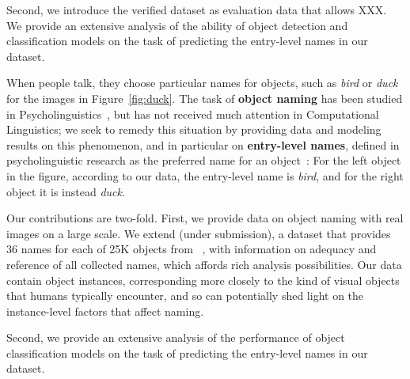 Second, we introduce the verified \mn dataset as evaluation data that allows XXX. We provide an extensive analysis of the ability of object detection and classification models on the task of predicting the entry-level names in our dataset.


When people talk, they choose particular names for objects, such as \textit{bird} or \textit{duck} for the images in Figure~\ref{fig:duck}.
The task of \textbf{object naming} has been studied in Psycholinguistics~\cite{refs},  but has not received much attention in Computational Linguistics; we seek to remedy this situation by providing data and modeling results on this phenomenon, and in particular on \textbf{entry-level names}, defined in psycholinguistic research as the preferred name for an object~\cite{rosch1976basic,Rosch1978,jolicoeur1984pictures}: For the left object in the figure, according to our data, the entry-level name is \textit{bird}, and for the right object it is instead \textit{duck}.


Our contributions are two-fold.
First, we provide data on object naming with real images on a large scale.
We extend \mn (under submission), a dataset that provides 36 names for each of 25K objects from \vg~\cite{+++}, with information on adequacy and reference of all collected names, which affords rich analysis possibilities. 
Our data contain object instances, corresponding more closely to the kind of visual objects that humans typically encounter, and so can potentially shed light on the instance-level factors that affect naming. 

Second, we provide an extensive analysis of the performance of object classification models on the task of predicting the entry-level names in our dataset.

